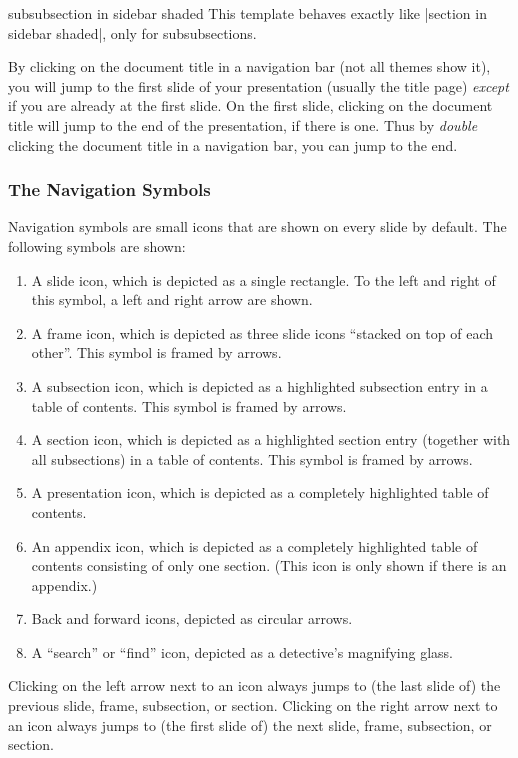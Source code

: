 \begin{element}{subsubsection in sidebar shaded}\yes\no\no
  This template behaves exactly like |section in sidebar shaded|, only for subsubsections.
\end{element}

By clicking on the document title in a navigation bar (not all themes show it), you will jump to the first slide of your presentation (usually the title page) \emph{except} if you are already at the first slide. On the first slide, clicking on the document title will jump to the end of the presentation, if there is one. Thus by \emph{double} clicking the document title in a navigation bar, you can jump to the end.

\subsubsection{The Navigation Symbols}
\label{section-navigation-symbols}

Navigation symbols are small icons that are shown on every slide by default. The following symbols are shown:
\begin{enumerate}
\item
  A slide icon, which is depicted as a single rectangle. To the left and right of this symbol, a left and right arrow are shown.
\item
  A frame icon, which is depicted as three slide icons ``stacked on top of each other''. This symbol is framed by arrows.
\item
  A subsection icon, which is depicted as a highlighted subsection entry in a table of contents. This symbol is framed by arrows.
\item
  A section icon, which is depicted as a highlighted section entry (together with all subsections) in a table of contents. This symbol is framed by arrows.
\item
  A presentation icon, which is depicted as a completely highlighted table of contents.
\item
  An appendix icon, which is depicted as a completely highlighted table of contents consisting of only one section. (This icon is only shown if there is an appendix.)
\item
  Back and forward icons, depicted as circular arrows.
\item
  A ``search'' or ``find'' icon, depicted as a detective's magnifying glass.
\end{enumerate}

Clicking on the left arrow next to an icon always jumps to (the last slide of) the previous slide, frame, subsection, or section. Clicking on the right arrow next to an icon always jumps to (the first slide of) the next slide, frame, subsection, or section.

